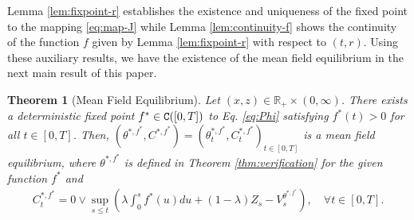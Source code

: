 \documentclass[11pt,times,letter]{article}
\newcommand{\R}{\mathds{R}}
\newcommand{\C}{{\tt{C}}}
\newtheorem{theorem}{Theorem}[section]
\numberwithin{equation}{section}
\begin{document}
Lemma \ref{lem:fixpoint-r} establishes the existence and uniqueness of the fixed point to the mapping \eqref{eq:map-J} while Lemma \ref{lem:continuity-f} shows the continuity of the function $f$ given by Lemma \ref{lem:fixpoint-r} with respect to $(t,r)$. Using these auxiliary results, we have the existence of the mean field equilibrium in the next main result of this paper.
\begin{theorem}[Mean Field Equilibrium]\label{thm:MF-equilibrium}
Let $(x,z)\in\R_+\times (0,\infty)$. There exists a  deterministic fixed point $f^*\in\C([0,T])$ to Eq. \eqref{eq:Phi} satisfying $f^*(t)>0$ for all $t\in[0,T]$. Then, $(\theta^{*,f^*},C^{*,f^*})=(\theta_t^{*,f^*},C_t^{*,f^*})_{t\in[0,T]}$ is a mean field equilibrium, where $\theta^{*,f^*}$ is defined in  Theorem \ref{thm:verification} for the given function $f^*$ and
\begin{align*}
C_t^{*,f^*}=0\vee \sup_{s\leq t}\left(\lambda \int_0^s f^*(u)du +(1-\lambda )Z_s-V_{s}^{\theta^{*,f^*}}\right),\quad\forall t\in[0,T].    
\end{align*}
\end{theorem}
\end{document}
